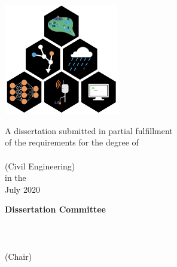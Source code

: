 \begin{titlepage}
    \begin{addmargin}[-1cm]{-3cm}
    \begin{center}
        \large

        \hfill

        \vfill

        \begingroup
            \color{CTtitle}\spacedallcaps{\myTitle} \\ \bigskip
        \endgroup

        \spacedlowsmallcaps{\myName}

        \vfill

        \includegraphics[width=5cm]{gfx/title_page.png} \\ \medskip

	\medskip
	A dissertation submitted in partial fulfillment\\
	of the requirements for the degree of \\
        \myDegree \\
	(Civil Engineering)\\
        in the \myUni \\
	July 2020

	\vfill 

	\textbf{Dissertation Committee}\\ \medskip
	\myFaculty\\
	\myProf \\
	\myOtherProf \\
	\mySupervisor (Chair)


        \vfill

    \end{center}
  \end{addmargin}
\end{titlepage}
